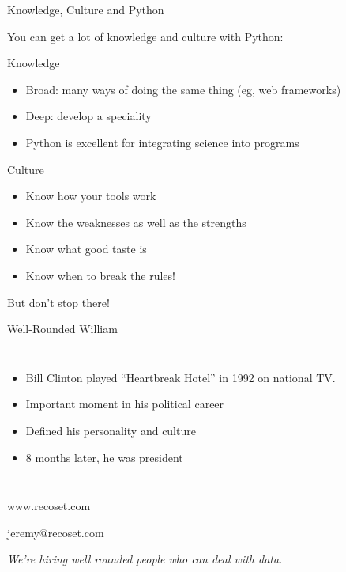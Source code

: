 \documentclass{beamer}
\begin{document}
\begin{frame}{Knowledge, Culture and Python}

You can get a lot of knowledge and culture with Python:

\vskip 0.5cm

Knowledge
\begin{itemize}
\item Broad: many ways of doing the same thing (eg, web frameworks)
\item Deep: develop a speciality
\item Python is excellent for \alert{integrating science into programs}
\end{itemize}

Culture
\begin{itemize}
\item Know \alert{how} your tools work
\item Know the \alert{weaknesses} as well as the strengths
\item Know what \alert{good taste} is
\item Know when to break the rules!
\end{itemize}

\vskip 0.5cm

But don't stop there!

\end{frame}


\begin{frame}{Well-Rounded William}

\begin{columns}

  \begin{itemize}
  \item Bill Clinton played ``Heartbreak Hotel'' in 1992 on national TV.
  \item Important moment in his political career
  \item Defined his \alert{personality} and \alert{culture}
  \item 8 months later, he was president
  \end{itemize}

\end{columns}

\end{frame}

\begin{frame}

  \begin{center}
  www.recoset.com

  \vskip 1cm

  jeremy@recoset.com

  \vskip 1cm

  \textit{We're hiring \alert{well rounded} people who can deal with data.}

\end{center}

\end{frame}
\end{document}
